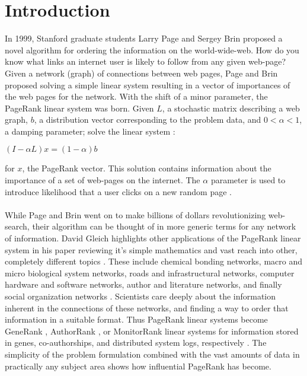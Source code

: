 


\linespread{1.5}
%

\chapter{Introduction}
In 1999, Stanford graduate students Larry Page and Sergey Brin proposed a novel algorithm for ordering the information on the world-wide-web. How do you know what links an internet user is likely to follow from any given web-page? Given a network (graph) of connections between web pages, Page and Brin proposed solving a simple linear system resulting in a vector of importances of the web pages for the network. With the shift of a minor parameter, the PageRank linear system was born. Given \textbf{$L$}, a stochastic matrix describing a web graph, \textbf{$b$}, a distribution vector corresponding to the problem data, and $0 < \alpha < 1$, a damping parameter; solve the linear system \cite{Page:1999}:\\
\begin{center}
$(I-\alpha L)x = (1-\alpha)b$ \\
\end{center}
for \textbf{$x$}, the PageRank vector. This solution contains information about the importance of a set of web-pages on the internet. The $\alpha$ parameter is used to introduce likelihood that a user clicks on a new random page \cite{Page:1999}.\\
\\
While Page and Brin went on to make billions of dollars revolutionizing web-search, their algorithm can be thought of in more generic terms for any network of information. David Gleich highlights other applications of the PageRank linear system in his paper reviewing it's simple mathematics and vast reach into other, completely different topics \cite{Gleich:2015}. These include chemical bonding networks, macro and micro biological system networks, roads and infrastructural networks, computer hardware and software networks, author and literature networks, and finally social organization networks \cite{Gleich:2015}. Scientists care deeply about the information inherent in the connections of these networks, and finding a way to order that information in a suitable format. Thus PageRank linear systems become GeneRank \cite{Jiang:2009}, AuthorRank \cite{Liu:2005}, or MonitorRank \cite{Kim:2013} linear systems for information stored in genes, co-authorships, and distributed system logs, respectively \cite{Gleich:2015}. The simplicity of the problem formulation combined with the vast amounts of data in practically any subject area shows how influential PageRank has become.\\

